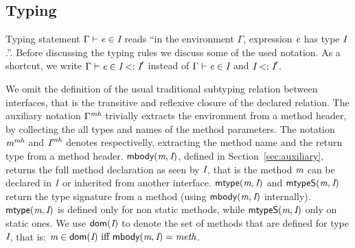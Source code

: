 \subsection{Typing}

Typing statement $\Gamma \vdash \textit{e}\in\textit{I}$ reads ``in the environment
$\Gamma$, expression $\textit{e}$ has type $\textit{I}$.''.
Before discussing the typing rules we discuss some of the used notation.
As a shortcut, we write
$\Gamma \vdash \textit{e}\in\textit{I}<:\textit{I}'$ instead of $\Gamma \vdash \textit{e}\in\textit{I}$ and
$\textit{I}<:\textit{I}'$.

We omit the definition of
the usual traditional subtyping relation between interfaces, that is the transitive and reflexive closure of the declared \Q@extends@ relation.
The auxiliary notation $\Gamma^\textit{mh}$ trivially
extracts the environment from a method header, by collecting the all types
and names of the method parameters.  The
notation $\textit{m}^\textit{mh}$ and $\textit{I}^\textit{mh}$ denotes respectivelly, extracting the
method name and the return type from a method header. $\textsf{mbody}(\textit{m},\textit{I})$,
defined in Section~\ref{sec:auxiliary},
returns the full method declaration as seen by $\textit{I}$, that is the
method $\textit{m}$ can be declared in $\textit{I}$ or inherited from another
interface.
$\textsf{mtype}(\textit{m},\textit{I})$ and $\textsf{mtypeS}(\textit{m},\textit{I})$ return the type
signature from a method (using $\textsf{mbody}(\textit{m},\textit{I})$ internally).
$\textsf{mtype}(\textit{m},\textit{I})$ is defined only for non static methods, while
$\textsf{mtypeS}(\textit{m},\textit{I})$ only on static ones. We use $\textsf{dom}(\textit{I})$ to
denote the set of methods that are defined for type $\textit{I}$, that is:
$\m\in\dom(\C)\ \miff \ \mBody(\m,\C)=\method$.

